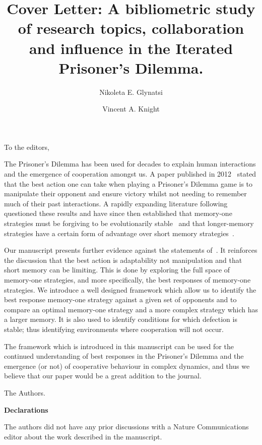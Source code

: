 \documentclass{article}
\title{Cover Letter: A bibliometric study of research topics, collaboration and
influence in the Iterated Prisoner’s Dilemma.}
\author[1, *]{Nikoleta E. Glynatsi}
\author[1]{Vincent A. Knight}
\affil[1]{Cardiff University, School of Mathematics, Cardiff, United Kingdom}
\affil[*]{Corresponding author: Nikoleta E. Glynatsi, glynatsine@cardiff.ac.uk}
\date{}
\begin{document}
 
\maketitle

To the editors,
 
The Prisoner's Dilemma has been used for decades to explain human interactions
and the emergence of cooperation amongst us. A paper published in
2012~\cite{Press2012} stated that the best action one can take when playing a
Prisoner's Dilemma game is to manipulate their opponent and ensure victory
whilst not needing to remember much of their past interactions. A rapidly
expanding literature following~\cite{Press2012} questioned these results and
have since then established that memory-one strategies must be forgiving to be
evolutionarily stable~\cite{Stewart2013} and that longer-memory strategies have
a certain form of advantage over short memory strategies~\cite{Hilbe2017}.
 
Our manuscript presents further evidence against the statements
of~\cite{Press2012}. It reinforces the discussion that the best action is
adaptability not manipulation and that short memory can be limiting. This is
done by exploring the full space of memory-one strategies, and more specifically, the best
responses of memory-one strategies. We introduce a well designed framework which
allow us to identify the best response memory-one strategy against a given set
of opponents and to compare an optimal memory-one strategy and a more complex
strategy which has a larger memory. It is also used to identify conditions for
which defection is stable; thus identifying environments where cooperation will
not occur.
 
The framework which is introduced in this manuscript can be used for the
continued understanding of best responses in the Prisoner’s Dilemma and the
emergence (or not) of cooperative behaviour in complex dynamics, and thus we
believe that our paper would be a great addition to the journal.
 
The Authors.

\textbf{Declarations}

The authors did not have any prior discussions with a Nature Communications editor
about the work described in the manuscript.
 


\end{document}
